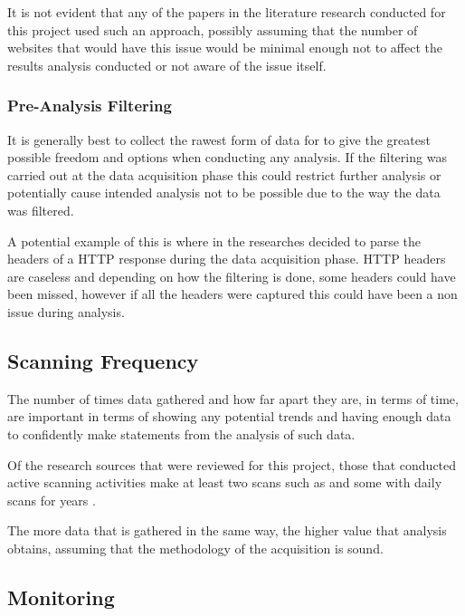 \documentclass{mscreport}
\begin{document}
\vspace{0.3cm} \noindent
It is not evident that any of the papers in the literature research conducted for this project used such an approach, possibly assuming that the number of websites that would have this issue would be minimal enough not to affect the results analysis conducted or not aware of the issue itself.

\subsubsection{Pre-Analysis Filtering}
It is generally best to collect the rawest form of data for to give the greatest possible freedom and options when conducting any analysis. If the filtering was carried out at the data acquisition phase this could restrict further analysis or potentially cause intended analysis not to be possible due to the way the data was filtered.

\vspace{0.3cm} \noindent
A potential example of this is where in \cite{Buchanan2018-xz} the researches decided to parse the headers of a HTTP response during the data acquisition phase. HTTP headers are caseless \cite{Berners-Lee1996-ji} and depending on how the filtering is done, some headers could have been missed, however if all the headers were captured this could have been a non issue during analysis.

\subsection{Scanning Frequency}

The number of times data gathered and how far apart they are, in terms of time, are important in terms of showing any potential trends and having enough data to confidently make statements from the analysis of such data.

\vspace{0.3cm} \noindent
Of the research sources that were reviewed for this project, those that conducted active scanning activities make at least two scans such as \cite{Buchanan2018-xz,Amann2017-co,Chen2016-dl,Kumar2017-qw} and some with daily scans for years \cite{Holz2020-ha}.

\vspace{0.3cm} \noindent
The more data that is gathered in the same way, the higher value that analysis obtains, assuming that the methodology of the acquisition is sound.

\subsection{Monitoring}
\end{document}
